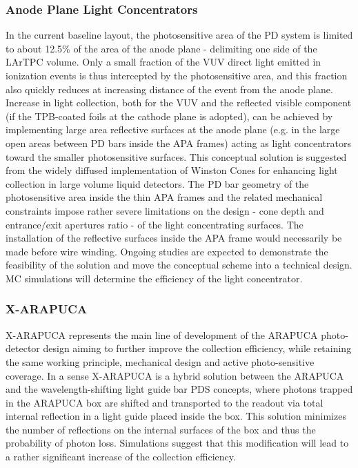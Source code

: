 
\subsubsection{Anode Plane Light Concentrators}
\label{sec:fdsp-pd-assy-lc}
	
In the current baseline layout, the photosensitive area of the PD system is limited to about 12.5\% of the area of the anode plane - delimiting one side of the LArTPC volume. 
Only a small fraction of the VUV direct light emitted in ionization events is thus intercepted by the photosensitive area, and this fraction also quickly reduces at increasing distance of the event from the anode plane.  Increase in light collection, both for the VUV and the reflected visible component (if the  TPB-coated foils at the cathode plane is adopted), can be achieved by implementing large area reflective surfaces at the anode plane (e.g. in the large open areas between PD bars inside the APA frames) acting as light concentrators toward the smaller photosensitive surfaces.  
This conceptual solution is suggested from the widely diffused implementation of Winston Cones for enhancing light collection in large volume liquid detectors. 
The PD bar geometry of the photosensitive area inside the thin APA frames and the related mechanical constraints impose rather severe limitations on the design - cone depth and entrance$/$exit apertures ratio - of the light concentrating surfaces. The installation of the reflective surfaces inside the APA frame would necessarily be made before wire winding. 
Ongoing studies are expected to demonstrate the feasibility of the solution and move the conceptual scheme into a technical design. MC simulations will determine the efficiency of the light concentrator. 



\subsubsection{X-ARAPUCA}  
X-ARAPUCA represents the main line of development of the ARAPUCA photo-detector design aiming to further improve the collection efficiency, while retaining the same working principle, mechanical design and active  photo-sensitive coverage. In a sense X-ARAPUCA is a hybrid solution between the ARAPUCA and the wavelength-shifting light guide bar PDS concepts, where photons trapped in the ARAPUCA box are shifted and transported to the readout via total internal reflection in a light guide placed inside the box.
This solution minimizes the number of reflections on the internal surfaces of the box and thus the probability of photon loss. Simulations suggest that this modification will lead to a rather significant increase of the collection efficiency.

